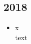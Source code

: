 \subsection*{2018}
\begin{history}


    \begin{itemize}

        \item x\\
              text

    \end{itemize}

\end{history}
